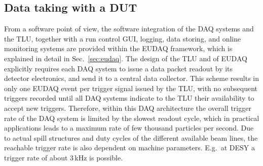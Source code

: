 \subsection{Data taking with a DUT}

From a software point of view, the software integration of the DAQ systems and the TLU, together with a run control GUI, logging, data storing, and online monitoring systems are provided within the EUDAQ framework,
 which is explained in detail in Sec.~\ref{sec:eudaq}. 
The design of the TLU and of EUDAQ explicitly requires each DAQ system to issue a data packet readout by its detector electronics, and send it to a central data collector. 
This scheme results in only one EUDAQ event per trigger signal issued by the TLU, with no subsequent triggers recorded until all DAQ systems indicate to the TLU their availability to accept new triggers.
Therefore, within this DAQ architecture the overall trigger rate of the DAQ system is limited by the slowest readout cycle,
 which in practical applications leads to a maximum rate of few thousand particles per second. 
Due to actual spill structures and duty cycles of the different available beam lines, the reachable trigger rate is also dependent on machine parameters. 
E.g.~at DESY a trigger rate of about 3\,kHz is possible. 



